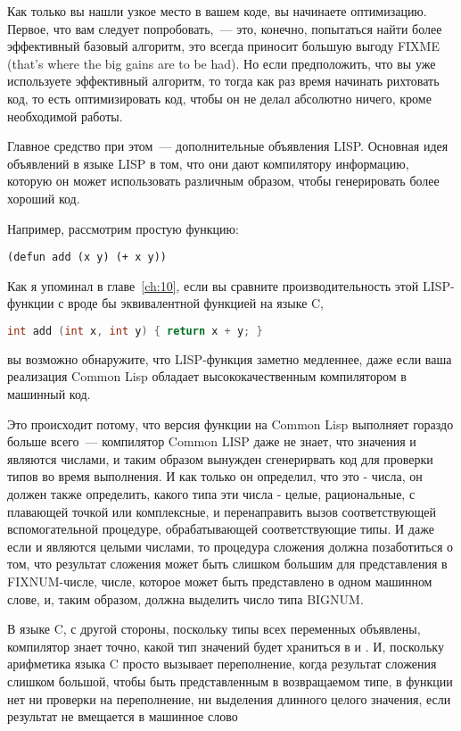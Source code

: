 Как только вы нашли узкое место в вашем коде, вы начинаете оптимизацию. Первое, что вам
следует попробовать,~--- это, конечно, попытаться найти более эффективный базовый
алгоритм, это всегда приносит большую выгоду FIXME (that's where the big gains are to be
had). Но если предположить, что вы уже используете эффективный алгоритм, то тогда как раз
время начинать рихтовать код, то есть оптимизировать код, чтобы он не делал абсолютно
ничего, кроме необходимой работы.

Главное средство при этом~--- дополнительные объявления LISP. Основная идея объявлений в
языке LISP в том, что они дают компилятору информацию, которую он может использовать
различным образом, чтобы генерировать более хороший код.

Например, рассмотрим простую функцию:

\begin{lstlisting}
(defun add (x y) (+ x y))
\end{lstlisting}

Как я упоминал в главе~\ref{ch:10}, если вы сравните производительность этой LISP-функции
с вроде бы эквивалентной функцией на языке C,

\begin{lstlisting}[language=C]
int add (int x, int y) { return x + y; }
\end{lstlisting}

вы возможно обнаружите, что LISP-функция заметно медленнее, даже если ваша реализация
Common Lisp обладает высококачественным компилятором в машинный код.

Это происходит потому, что версия функции на Common Lisp выполняет гораздо больше
всего~--- компилятор Common LISP даже не знает, что значения  и  являются
числами, и таким образом вынужден сгенерирвать код для проверки типов во время выполнения.
И как только он определил, что это - числа, он должен также определить, какого типа эти
числа - целые, рациональные, с плавающей точкой или комплексные, и перенаправить вызов
соответствующей вспомогательной процедуре, обрабатывающей соответствующие типы. И даже
если  и  являются целыми числами, то процедура сложения должна
позаботиться о том, что результат сложения может быть слишком большим для представления в
FIXNUM-числе, числе, которое может быть представлено в одном машинном слове, и, таким
образом, должна выделить число типа BIGNUM.

В языке C, с другой стороны, поскольку типы всех переменных объявлены, компилятор знает
точно, какой тип значений будет храниться в  и . И, поскольку арифметика
языка C просто вызывает переполнение, когда результат сложения слишком большой, чтобы быть
представленным в возвращаемом типе, в функции нет ни проверки на переполнение, ни
выделения длинного целого значения, если результат не вмещается в машинное слово

